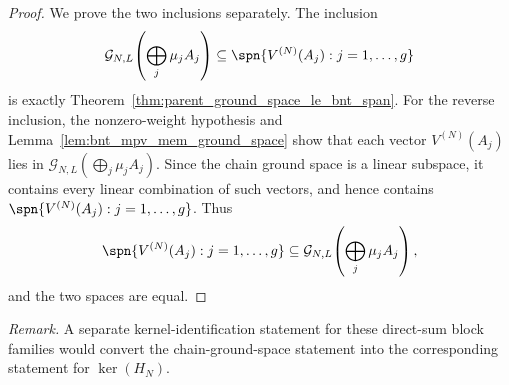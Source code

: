 \begin{proof}
    \notready
    We prove the two inclusions separately. The inclusion
    \[
        \mathcal G_{N,L}\!\left(\bigoplus_j \mu_j A_j\right)
        \subseteq
        \spn\{V^{(N)}(A_j): j=1,\ldots,g\}
    \]
    is exactly Theorem~\ref{thm:parent_ground_space_le_bnt_span}. For the reverse inclusion,
    the nonzero-weight hypothesis and Lemma~\ref{lem:bnt_mpv_mem_ground_space}
    show that each vector $V^{(N)}(A_j)$ lies in
    $\mathcal G_{N,L}(\bigoplus_j \mu_j A_j)$. Since the chain ground space is a
    linear subspace, it contains every linear combination
    of such vectors, and hence contains
    $\spn\{V^{(N)}(A_j): j=1,\ldots,g\}$. Thus
    \[
        \spn\{V^{(N)}(A_j): j=1,\ldots,g\}
        \subseteq
        \mathcal G_{N,L}\!\left(\bigoplus_j \mu_j A_j\right),
    \]
    and the two spaces are equal.
\end{proof}

\noindent\emph{Remark.} A separate kernel-identification statement for these direct-sum
block families would convert the chain-ground-space statement into the
corresponding statement for $\ker(H_N)$.
